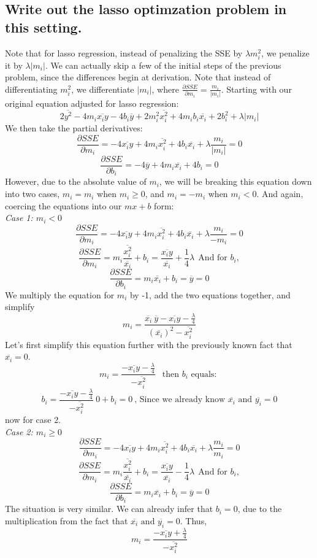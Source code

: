 \documentclass[20pt]{article} %
\begin{document}
\newpage
\subsection{Write out the lasso optimzation problem in this setting.}
Note that for lasso regression, instead of penalizing the SSE by $\lambda m_i^{2}$, we penalize it by $\lambda |m_i|$.  We can actually skip a few of the initial steps of the previous problem, since the differences begin at derivation.  Note that instead of differentiating $m_i^{2}$, we differentiate $|m_i|$, where $\frac{\partial SSE}{\partial m_i} = \frac{m_i}{|m_i|}$. Starting with our original equation adjusted for lasso regression:
$$2\overline{y^{2}} - 4m_i\overline{x_iy} - 4b_i\overline{y} + 2m_i^{2}\overline{x_i^{2}} + 4m_ib_i\overline{x_i} + 2b_i^{2} + \lambda |m_i|$$
We then take the partial derivatives:
$$\frac{\partial SSE}{\partial m_i} = -4\overline{x_iy} + 4m_i\overline{x_i^{2}} + 4b_i\overline{x_i} +  \lambda \frac{m_i}{|m_i|} = 0$$
$$\frac{\partial SSE}{\partial b_i} = -4\overline{y} + 4 m_i \overline{x_i} + 4b_i = 0$$
However, due to the absolute value of $m_i$, we will be breaking this equation down into two cases, $m_i = m_i$ when $m_i \geq 0$, and $m_i = -m_i$ when $m_i < 0$.  And again, coercing the equations into our $mx+b$ form: \\
\textit{Case 1: $m_i < 0$}
$$\frac{\partial SSE}{\partial m_i} = -4\overline{x_iy} + 4m_i\overline{x_i^{2}} + 4b_i\overline{x_i} +  \lambda \frac{m_i}{-m_i} = 0$$
$$\frac{\partial SSE}{\partial m_i} =m_i \frac{\overline{x_i^{2}}}{\overline{x_i}} + b_i =  \frac{\overline{x_iy}}{\overline{x_i}} +  \frac{1}{4}\lambda \ \ \text{And for } b_i,$$
$$\frac{\partial SSE}{\partial b_i} = m_i \overline{x_i} + b_i = \overline{y} = 0$$
We multiply the equation for $m_i$ by -1, add the two equations together, and simplify
$$m_i = \frac{ \overline{x_i} \ \overline{y} - \overline{x_iy} - \frac{\lambda}{4}}{( \overline{x_i} )^{2} - \overline{x_i^{2}}}$$
Let's first simplify this equation further with the previously known fact that $\overline{x_i} = 0$.
$$m_i = \frac{- \overline{x_iy} - \frac{\lambda}{4}}{- \overline{x_i^{2}}} \ \ \text{ then } b_i \text{ equals: }$$
$$b_i = \frac{- \overline{x_iy} - \frac{\lambda}{4}}{- \overline{x_i^{2}}} \ 0 + b_i = 0 \ \text{, Since we already know } \overline{x_i} \text{ and } \overline{y_i} = 0$$
now for case 2. \\
\textit{Case 2: $m_i \geq 0$}
$$\frac{\partial SSE}{\partial m_i} = -4\overline{x_iy} + 4m_i\overline{x_i^{2}} + 4b_i\overline{x_i} +  \lambda \frac{m_i}{m_i} = 0$$
$$\frac{\partial SSE}{\partial m_i} =m_i \frac{\overline{x_i^{2}}}{\overline{x_i}} + b_i =  \frac{\overline{x_iy}}{\overline{x_i}} -  \frac{1}{4}\lambda \ \ \text{And for } b_i,$$
$$\frac{\partial SSE}{\partial b_i} = m_i \overline{x_i} + b_i = \overline{y} = 0$$
The situation is very similar. We can already infer that $b_i = 0$, due to the multiplication from the fact that $\overline{x_i} \text{ and } \overline{y_i} = 0$. Thus,
$$m_i = \frac{- \overline{x_iy} + \frac{\lambda}{4}}{- \overline{x_i^{2}}}$$
\end{document}
